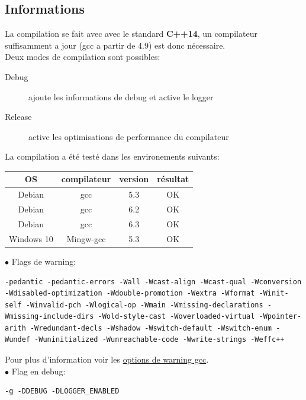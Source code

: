 \documentclass[article, backcover, french, nodocumentinfo]{upmethodology-document}
\begin{document}
		\subsection{Informations}
				La compilation se fait avec avec le standard \textbf{C++14}, un compilateur suffisamment a jour (gcc a partir de 4.9) est donc nécessaire.\\
				Deux modes de compilation sont possibles:
				\begin{description}
					\item[Debug] ajoute les informations de debug et active le logger
					\item[Release] active les optimisations de performance du compilateur
				\end{description}
				La compilation a été testé dans les environements suivants:
				\begin{center}
					\begin{tabular}{|c|c|c|c|}
						\hline
						OS & compilateur & version & résultat\\
						\hline
						Debian & gcc & 5.3 & OK\cellcolor{green}\\
						\hline
						Debian & gcc & 6.2 & OK\cellcolor{green}\\
						\hline
						Debian & gcc & 6.3 & OK\cellcolor{green}\\
						\hline
						Windows 10 & Mingw-gcc & 5.3 & OK\cellcolor{green}\\
						\hline
					\end{tabular}
				\end{center}
				$\bullet$ Flags de warning:
				\begin{lstlisting}[breaklines=true,breakatwhitespace=true,breakindent=0pt,columns=fixed,keepspaces=true,frame=single,basicstyle=\footnotesize\sffamily]
-pedantic -pedantic-errors -Wall -Wcast-align -Wcast-qual -Wconversion -Wdisabled-optimization -Wdouble-promotion -Wextra -Wformat -Winit-self -Winvalid-pch -Wlogical-op -Wmain -Wmissing-declarations -Wmissing-include-dirs -Wold-style-cast -Woverloaded-virtual -Wpointer-arith -Wredundant-decls -Wshadow -Wswitch-default -Wswitch-enum -Wundef -Wuninitialized -Wunreachable-code -Wwrite-strings -Weffc++\end{lstlisting}
				Pour plus d'information voir les \href{https://gcc.gnu.org/onlinedocs/gcc/Warning-Options.html}{options de warning gcc}.\\
				$\bullet$ Flag en debug:
				\begin{lstlisting}[breaklines=true,breakatwhitespace=true,breakindent=0pt,columns=fixed,keepspaces=true,frame=single,basicstyle=\footnotesize\sffamily]
-g -DDEBUG -DLOGGER_ENABLED\end{lstlisting}
\end{document}
